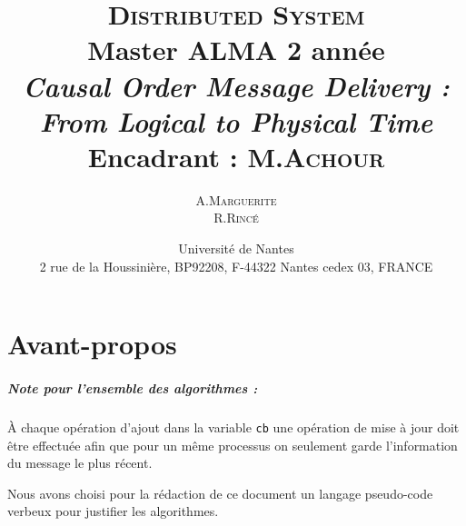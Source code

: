 \documentclass{report}
\title{ {\huge \textsc{Distributed System}} \\Master ALMA 2\up{eme} année \\\vspace{3cm} \emph{Causal Order Message Delivery : From Logical to Physical Time}\\{\small Encadrant : M.\textsc{Achour}}\vspace{3cm}}
\author{A.\textsc{Marguerite}\\ R.\textsc{Rincé}\vspace{3cm}}
\date{Université de Nantes \\ 2 rue de la Houssinière, BP92208, F-44322 Nantes cedex 03, FRANCE}
\begin{document}
\maketitle
\renewcommand{\labelitemi}{$\bullet$} 

\clearpage

\tableofcontents
\clearpage

%
%
\chapter*{Avant-propos}
\paragraph{Note pour l'ensemble des algorithmes :} 
À chaque opération d'ajout dans la variable \verb+cb+ une opération de mise à jour doit être effectuée afin que pour un même processus on seulement garde l'information du message le plus récent. 

Nous avons choisi pour la rédaction de ce document un langage pseudo-code verbeux pour justifier les algorithmes.






\listoffigures
%
%
\end{document}
